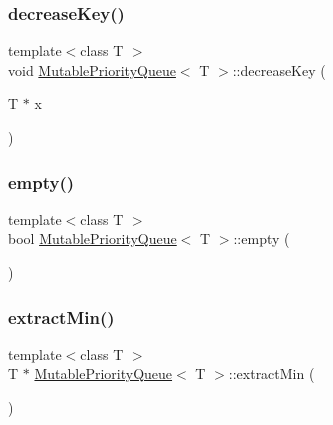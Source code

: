 \subsubsection{\texorpdfstring{decrease\+Key()}{decreaseKey()}}
{\footnotesize\ttfamily template$<$class T $>$ \\
void \mbox{\hyperlink{class_mutable_priority_queue}{Mutable\+Priority\+Queue}}$<$ T $>$\+::decrease\+Key (\begin{DoxyParamCaption}\item[{T $\ast$}]{x }\end{DoxyParamCaption})}

\mbox{\label{class_mutable_priority_queue_a2edbb1f4a6fa3ff735700dfcebebe8d4}} 
\subsubsection{\texorpdfstring{empty()}{empty()}}
{\footnotesize\ttfamily template$<$class T $>$ \\
bool \mbox{\hyperlink{class_mutable_priority_queue}{Mutable\+Priority\+Queue}}$<$ T $>$\+::empty (\begin{DoxyParamCaption}{ }\end{DoxyParamCaption})}

\mbox{\label{class_mutable_priority_queue_a3880874d7364279ac0d6d31302b28853}} 
\subsubsection{\texorpdfstring{extract\+Min()}{extractMin()}}
{\footnotesize\ttfamily template$<$class T $>$ \\
T $\ast$ \mbox{\hyperlink{class_mutable_priority_queue}{Mutable\+Priority\+Queue}}$<$ T $>$\+::extract\+Min (\begin{DoxyParamCaption}{ }\end{DoxyParamCaption})}

\mbox{\label{class_mutable_priority_queue_a699bfb6d976cabb01edead4c24284a08}} 
